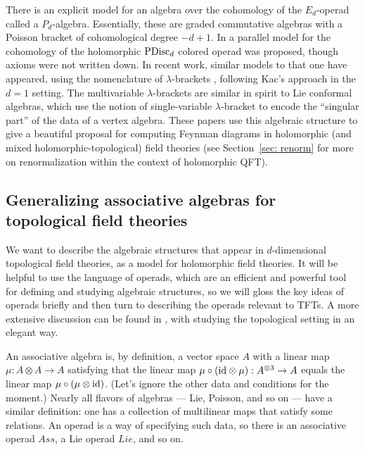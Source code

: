 \documentclass[11pt]{amsart}
\begin{document}
There is an explicit model for an algebra over the cohomology of the $E_d$-operad called a $P_d$-algebra.
Essentially, these are graded commutative algebras with a Poisson bracket of cohomological degree $-d+1$.
In \cite{CostelloScheimbauer} a parallel model for the cohomology of the holomorphic ${\rm PDisc}_d$ colored operad was proposed, 
though axioms were not written down.
In recent work, similar models to that one have appeared,
using the nomenclature of $\lambda$-brackets \cite{BGKWY,GKW},
following Kac's approach in the $d=1$ setting. 
The multivariable $\lambda$-brackets are similar in spirit to Lie conformal algebras,
which use the notion of single-variable $\lambda$-bracket to encode the ``singular part'' of the data of a vertex algebra.
These papers use this algebraic structure to give a beautiful proposal for computing Feynman diagrams in holomorphic (and mixed holomorphic-topological) field theories (see Section~\ref{sec: renorm} for more on renormalization within the context of holomorphic QFT).


\subsection{Generalizing associative algebras for topological field theories}

We want to describe the algebraic structures that appear in $d$-dimensional topological field theories,
as a model for holomorphic field theories.
It will be helpful to use the language of operads, which are an efficient and powerful tool for defining and studying algebraic structures,
so we will gloss the key ideas of operads briefly and then turn to describing the operads relevant to TFTs.
A more extensive discussion can be found in \cite{CG1}, with \cite{ES} studying the topological setting in an elegant way.

An associative algebra is, by definition, a vector space $A$ with a linear map $\mu: A\otimes A \to A$ satisfying that the linear map $\mu \circ ({\rm id} \otimes \mu): A^{\otimes 3} \to A$ equals the linear map $\mu \circ (\mu \otimes {\rm id})$.
(Let's ignore the other data and conditions for the moment.)
Nearly all flavors of algebras --- Lie, Poisson, and so on --- have a similar definition:
one has a collection of multilinear maps that satisfy some relations.
An operad is a way of specifying such data, so there is an associative operad $Ass$,
a Lie operad $Lie$, and so on.
\end{document}
